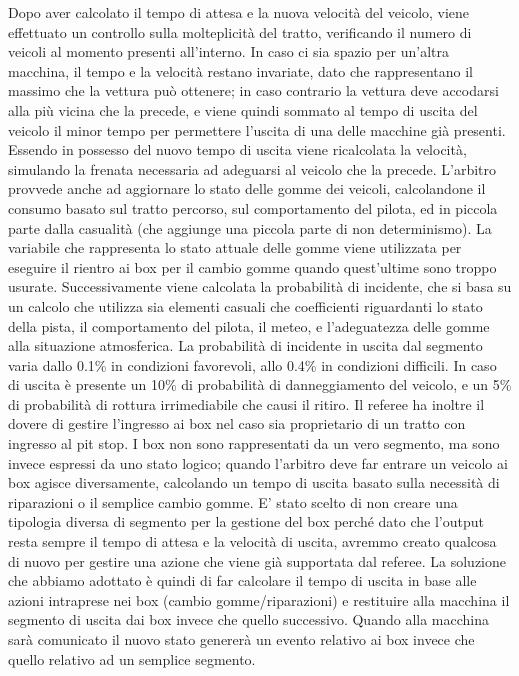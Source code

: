Dopo aver calcolato il tempo di attesa e la nuova velocità del veicolo, viene effettuato un controllo sulla molteplicità del tratto, verificando il numero di veicoli al momento presenti all’interno. In caso ci sia spazio per un’altra macchina, il tempo e la velocità restano invariate, dato che rappresentano il massimo che la vettura può ottenere; in caso contrario la vettura deve accodarsi alla più vicina che la precede, e viene quindi sommato al tempo di uscita del veicolo il minor tempo per permettere l’uscita di una delle macchine già presenti.
Essendo in possesso del nuovo tempo di uscita viene ricalcolata la velocità, simulando la frenata necessaria ad adeguarsi al veicolo che la precede.
L’arbitro provvede anche ad aggiornare lo stato delle gomme dei veicoli, calcolandone il consumo basato sul tratto percorso, sul comportamento del pilota, ed in piccola parte dalla casualità (che aggiunge una piccola parte di non determinismo). La variabile che rappresenta lo stato attuale delle gomme viene utilizzata per eseguire il rientro ai box per il cambio gomme quando quest’ultime sono troppo usurate.
Successivamente viene calcolata la probabilità di incidente, che si basa su un calcolo che utilizza sia elementi casuali che coefficienti riguardanti lo stato della pista, il comportamento del pilota, il meteo, e l’adeguatezza delle gomme alla situazione atmosferica. La probabilità di incidente in uscita dal segmento varia dallo 0.1\% in condizioni favorevoli, allo 0.4\% in condizioni difficili.
In caso di uscita è presente un 10\% di probabilità di danneggiamento del veicolo, e un 5\% di probabilità di rottura irrimediabile che causi il ritiro.
Il referee ha inoltre il dovere di gestire l’ingresso ai box nel caso sia proprietario di un tratto con ingresso al pit stop. I box non sono rappresentati da un vero segmento, ma sono invece espressi da uno stato logico; quando l’arbitro deve far entrare un veicolo ai box agisce diversamente, calcolando un tempo di uscita basato sulla necessità di riparazioni o il semplice cambio gomme. E’ stato scelto di non creare una tipologia diversa di segmento per la gestione del box perché dato che l’output resta sempre il tempo di attesa e la velocità di uscita, avremmo creato qualcosa di nuovo per gestire una azione che viene già supportata dal referee. La soluzione che abbiamo adottato è quindi di far calcolare il tempo di uscita in base alle azioni intraprese nei box (cambio gomme/riparazioni) e restituire alla macchina il segmento di uscita dai box invece che quello successivo. Quando alla macchina sarà comunicato il nuovo stato genererà un evento relativo ai box invece che quello relativo ad un semplice segmento.

